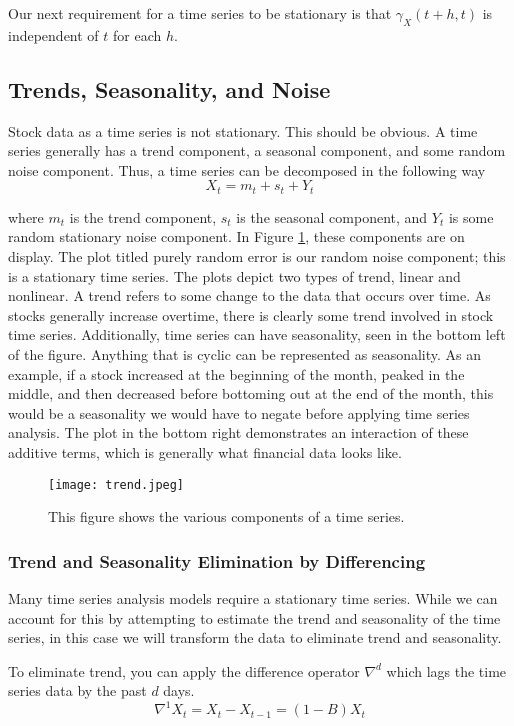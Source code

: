 \documentclass[12pt]{article}
\begin{document}
Our next requirement for a time series to be stationary is that $\gamma_X(t+h, t)$ is independent of $t$ for each $h$. 

\subsection{Trends, Seasonality, and Noise}
Stock data as a time series is not stationary. This should be obvious. A time series generally has a trend component, a seasonal component, and some random noise component. Thus, a time series can be decomposed in the following way
$$X_t = m_t + s_t + Y_t$$

where $m_t$ is the trend component, $s_t$ is the seasonal component, and $Y_t$ is some random stationary noise component. In Figure \ref{trends}, these components are on display. The plot titled purely random error is our random noise component; this is a stationary time series. The plots depict two types of trend, linear and nonlinear. A trend refers to some change to the data that occurs over time. As stocks generally increase overtime, there is clearly some trend involved in stock time series. Additionally, time series can have seasonality, seen in the bottom left of the figure. Anything that is cyclic can be represented as seasonality. As an example, if a stock increased at the beginning of the month, peaked in the middle, and then decreased before bottoming out at the end of the month, this would be a seasonality we would have to negate before applying time series analysis. The plot in the bottom right demonstrates an interaction of these additive terms, which is generally what financial data looks like. \cite[22]{timeseries}

\begin{figure}[ht]
	\centering
	\texttt{[image: trend.jpeg]}
	\caption{This figure shows the various components of a time series. \cite{trend}}
	\label{trends}
\end{figure}

\subsubsection{Trend and Seasonality Elimination by Differencing}
Many time series analysis models require a stationary time series. While we can account for this by attempting to estimate the trend and seasonality of the time series, in this case we will transform the data to eliminate trend and seasonality.

To eliminate trend, you can apply the difference operator $\nabla^d$ which lags the time series data by the past $d$ days.
$$\nabla^1 X_t = X_t - X_{t-1}=(1-B)X_t$$
\end{document}
